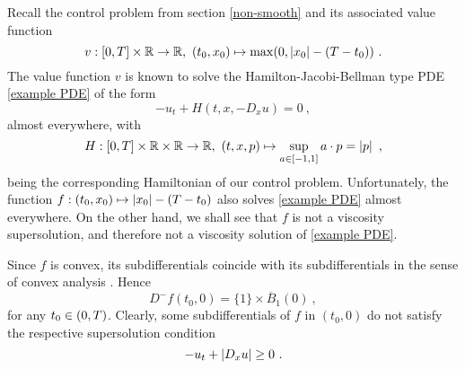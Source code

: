\begin{example}
	Recall the control problem from section \ref{non-smooth} and its associated value function
	\begin{equation*}
	v : \left[0, T\right] \times \mathbb{R} \to \mathbb{R}, \ (t_0, x_0) \mapsto \max(0, \left\lvert {x_0} \right\rvert - (T - t_0)) \ .
	\end{equation*}
	The value function $ v $ is known to solve the Hamilton-Jacobi-Bellman type PDE \eqref{example PDE} of the form
	\begin{equation*}
	-u_t + H(t, x, -D_x u) = 0 \ ,
	\end{equation*}
	almost everywhere, with
	\begin{equation*}
	H : \left[0, T\right] \times \mathbb{R} \times \mathbb{R} \to \mathbb{R}, \ (t, x, p) \mapsto \sup\limits_{a \in \left[ -1, 1 \right]} a \cdot p = \left\lvert {p} \right\rvert \ ,
	\end{equation*}
	being the corresponding Hamiltonian of our control problem. Unfortunately, the function $ f : (t_0, x_0) \mapsto \left\lvert {x_0} \right\rvert - (T - t_0) $ also solves \eqref{example PDE} almost everywhere. On the other hand, we shall see that $ f $ is not a viscosity supersolution, and therefore not a viscosity solution of \eqref{example PDE}.
	
	Since $ f $ is convex, its subdifferentials coincide with its subdifferentials in the sense of convex analysis \cite[see exercise 1.3, p~32]{bardi2008optimal}. Hence
	\begin{equation*}
		D^{-}f(t_0, 0) = \{1\} \times \overline{B}_{1}(0) \ ,
	\end{equation*}
	for any $ t_0 \in \left(0, T\right) $. Clearly, some subdifferentials of $ f $ in $ (t_0, 0) $ do not satisfy the respective supersolution condition
	\begin{equation*}
		-u_t + \left\lvert {D_x u} \right\rvert \geq 0 \ .
	\end{equation*}
\end{example}